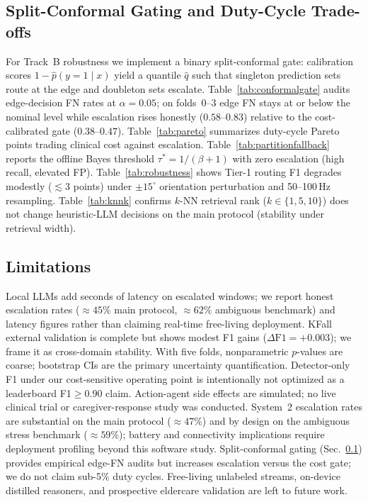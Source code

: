 \documentclass[journal]{IEEEtran}
\begin{document}
\subsection{Split-Conformal Gating and Duty-Cycle Trade-offs}
\label{sec:conformal}
For Track~B robustness we implement a binary split-conformal gate: calibration scores $1-\hat{p}(y{=}1\mid x)$ yield a quantile $\hat{q}$ such that singleton prediction sets route at the edge and doubleton sets escalate. Table~\ref{tab:conformalgate} audits edge-decision FN rates at $\alpha{=}0.05$; on folds~0--3 edge FN stays at or below the nominal level while escalation rises honestly ($0.58$--$0.83$) relative to the cost-calibrated gate ($0.38$--$0.47$). Table~\ref{tab:pareto} summarizes duty-cycle Pareto points trading clinical cost against escalation. Table~\ref{tab:partitionfallback} reports the offline Bayes threshold $\tau^\ast{=}1/(\beta{+}1)$ with zero escalation (high recall, elevated FP). Table~\ref{tab:robustness} shows Tier-1 routing F1 degrades modestly ($\lesssim 3$ points) under $\pm 15^\circ$ orientation perturbation and 50--100\,Hz resampling. Table~\ref{tab:knnk} confirms $k$-NN retrieval rank ($k\in\{1,5,10\}$) does not change heuristic-LLM decisions on the main protocol (stability under retrieval width).










\subsection{Limitations}
Local LLMs add seconds of latency on escalated windows; we report honest escalation rates ($\approx 45\%$ main protocol, $\approx 62\%$ ambiguous benchmark) and latency figures rather than claiming real-time free-living deployment. KFall external validation is complete but shows modest F1 gains ($\Delta\text{F1}{=}+0.003$); we frame it as cross-domain stability. With five folds, nonparametric $p$-values are coarse; bootstrap CIs are the primary uncertainty quantification. Detector-only F1 under our cost-sensitive operating point is intentionally not optimized as a leaderboard F1${\ge}0.90$ claim. Action-agent side effects are simulated; no live clinical trial or caregiver-response study was conducted. System~2 escalation rates are substantial on the main protocol ($\approx 47\%$) and by design on the ambiguous stress benchmark ($\approx 59\%$); battery and connectivity implications require deployment profiling beyond this software study. Split-conformal gating (Sec.~\ref{sec:conformal}) provides empirical edge-FN audits but increases escalation versus the cost gate; we do not claim sub-5\% duty cycles. Free-living unlabeled streams, on-device distilled reasoners, and prospective eldercare validation are left to future work.
\end{document}
